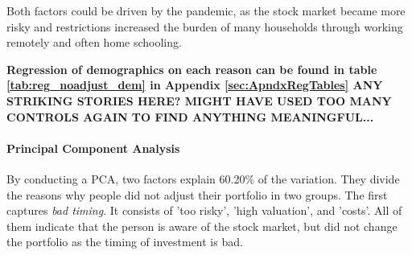 \documentclass[ProjectABM]{subfiles}
\begin{document}
Both factors could be driven by the pandemic, as the stock market became more risky and restrictions increased the burden of many households through working remotely and often home schooling.

\textbf{Regression of demographics on each reason can be found in table \ref{tab:reg_noadjust_dem} in Appendix \ref{sec:ApndxRegTables} ANY STRIKING STORIES HERE? MIGHT HAVE USED TOO MANY CONTROLS AGAIN TO FIND ANYTHING MEANINGFUL...}





\paragraph{Principal Component Analysis}
By conducting a PCA, two factors explain 60.20\% of the variation. They divide the reasons why people did not adjust their portfolio in two groups. The first captures \textit{bad timing}. It consists of 'too risky', 'high valuation', and 'costs'. All of them indicate that the person is aware of the stock market, but did not change the portfolio as the timing of investment is bad. %
\end{document}
